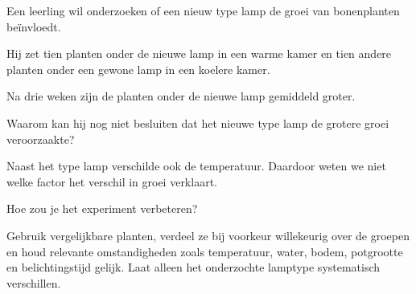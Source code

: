 \documentclass{ximera}
\begin{document}
\begin{oefening}{\oefU \ESS}

Een leerling wil onderzoeken of een nieuw type lamp de groei van
bonenplanten beïnvloedt.

Hij zet tien planten onder de nieuwe lamp in een warme kamer en tien
andere planten onder een gewone lamp in een koelere kamer.

Na drie weken zijn de planten onder de nieuwe lamp gemiddeld groter.

\begin{question}
Waarom kan hij nog niet besluiten dat het nieuwe type lamp de grotere
groei veroorzaakte?

\begin{oplossing}
Naast het type lamp verschilde ook de temperatuur. Daardoor weten we
niet welke factor het verschil in groei verklaart.
\end{oplossing}
\end{question}

\begin{question}
Hoe zou je het experiment verbeteren?

\begin{oplossing}
Gebruik vergelijkbare planten, verdeel ze bij voorkeur willekeurig over
de groepen en houd relevante omstandigheden zoals temperatuur, water,
bodem, potgrootte en belichtingstijd gelijk. Laat alleen het onderzochte
lamptype systematisch verschillen.
\end{oplossing}
\end{question}

\end{oefening}
\end{document}
